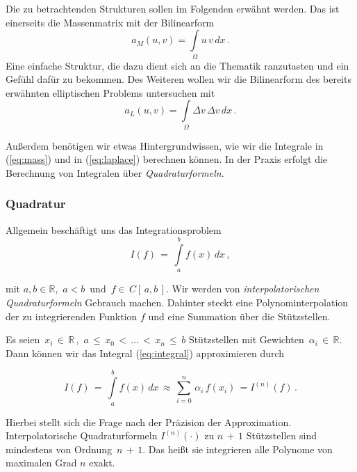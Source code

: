 Die zu betrachtenden Strukturen sollen im Folgenden erwähnt werden. Das ist einerseits die Massenmatrix mit der Bilinearform
\begin{equation} \label{eq:mass}
a_M(u,v)= \int\limits_{\Omega} u \, v \, dx \, .
\end{equation}
Eine einfache Struktur, die dazu dient sich an die Thematik ranzutasten und ein Gefühl dafür zu bekommen.
\newpage
Des Weiteren wollen wir die Bilinearform des bereits erwähnten elliptischen Problems untersuchen mit
\begin{equation} \label{eq:laplace}
a_L(u,v) = \int\limits_{\Omega} \Delta v \, \Delta v \, dx \, .
\end{equation}

Außerdem benötigen wir etwas Hintergrundwissen, wie wir die Integrale in (\ref{eq:mass}) und in (\ref{eq:laplace}) berechnen können. In der Praxis erfolgt die Berechnung von Integralen über   \textit{Quadraturformeln}.

\subsubsection{Quadratur}

Allgemein beschäftigt uns das Integrationsproblem
\begin{equation} \label{eq:integral}
I(f) \, = \, \int\limits_{a}^{b} f(x) \, dx \, ,
\end{equation}

mit $a,b \in \mathbb{R}$, $\, a < b \, $ und $\, f \in \, C[ \, a,b \, ] $.
Wir werden von \textit{interpolatorischen Quadraturformeln} Gebrauch machen. Dahinter steckt eine Polynominterpolation der zu integrierenden Funktion $f$ und eine Summation über die Stützstellen.

Es seien $\, x_i \, \in \, \mathbb{R} \,$, $\, a \, \leq \, x_0 \, < \, \dots \, < \, x_n \, \leq \, b$ Stützstellen mit Gewichten $\, \alpha_i \, \in \, \mathbb{R}$. Dann können wir das Integral (\ref{eq:integral}) approximieren durch

\begin{equation} \label{eq:integral}
I(f) \, = \, \int\limits_{a}^{b} f(x) \, dx \, \approx \, \sum\limits_{i=0}^{n} \, \alpha_i \, f(x_i) \, = I^{(n)}(f) \, .
\end{equation}

Hierbei stellt sich die Frage nach der Präzision der Approximation. Interpolatorische Quadraturformeln $I^{(n)}(\cdot)$ zu $n \, + \, 1$ Stützstellen sind mindestens von Ordnung $\, n \, + \,1$. Das heißt sie integrieren alle Polynome von maximalen Grad $n$ exakt.

